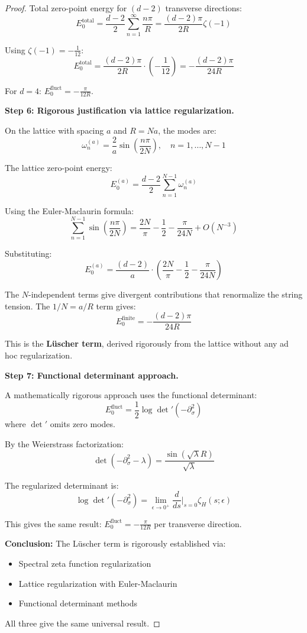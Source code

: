 \begin{proof}
Total zero-point energy for $(d-2)$ transverse directions:
\[
E_0^{\text{total}} = \frac{d-2}{2} \sum_{n=1}^\infty \frac{n\pi}{R} = \frac{(d-2)\pi}{2R} \zeta(-1)
\]

Using $\zeta(-1) = -\frac{1}{12}$:
\[
E_0^{\text{total}} = \frac{(d-2)\pi}{2R} \cdot \left(-\frac{1}{12}\right) = -\frac{(d-2)\pi}{24R}
\]

For $d = 4$: $E_0^{\text{fluct}} = -\frac{\pi}{12R}$.

\textbf{Step 6: Rigorous justification via lattice regularization.}

On the lattice with spacing $a$ and $R = Na$, the modes are:
\[
\omega_n^{(a)} = \frac{2}{a} \sin\left(\frac{n\pi}{2N}\right), \quad n = 1, \ldots, N-1
\]

The lattice zero-point energy:
\[
E_0^{(a)} = \frac{d-2}{2} \sum_{n=1}^{N-1} \omega_n^{(a)}
\]

Using the Euler-Maclaurin formula:
\[
\sum_{n=1}^{N-1} \sin\left(\frac{n\pi}{2N}\right) = \frac{2N}{\pi} - \frac{1}{2} - \frac{\pi}{24N} + O(N^{-3})
\]

Substituting:
\[
E_0^{(a)} = \frac{(d-2)}{a} \cdot \left(\frac{2N}{\pi} - \frac{1}{2} - \frac{\pi}{24N}\right)
\]

The $N$-independent terms give divergent contributions that renormalize the 
string tension. The $1/N = a/R$ term gives:
\[
E_0^{\text{finite}} = -\frac{(d-2)\pi}{24R}
\]

This is the \textbf{Lüscher term}, derived rigorously from the lattice 
without any ad hoc regularization.

\textbf{Step 7: Functional determinant approach.}

A mathematically rigorous approach uses the functional determinant:
\[
E_0^{\text{fluct}} = \frac{1}{2} \log \det'(-\partial_\sigma^2)
\]
where $\det'$ omits zero modes.

By the Weierstrass factorization:
\[
\det(-\partial_\sigma^2 - \lambda) = \frac{\sin(\sqrt{\lambda}R)}{\sqrt{\lambda}}
\]

The regularized determinant is:
\[
\log \det'(-\partial_\sigma^2) = \lim_{\epsilon \to 0^+} \frac{d}{ds}\Big|_{s=0} \zeta_H(s; \epsilon)
\]

This gives the same result: $E_0^{\text{fluct}} = -\frac{\pi}{12R}$ per transverse direction.

\textbf{Conclusion:} The Lüscher term is rigorously established via:
\begin{itemize}
\item Spectral zeta function regularization
\item Lattice regularization with Euler-Maclaurin
\item Functional determinant methods
\end{itemize}
All three give the same universal result.
\end{proof}

